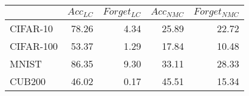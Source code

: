 \begin{tabular}{lrrrr}
\toprule
{} &  $Acc_{LC}$ &  $Forget_{LC}$ &  $Acc_{NMC}$ &  $Forget_{NMC}$ \\
\midrule
CIFAR-10  &       78.26 &           4.34 &        25.89 &           22.72 \\
CIFAR-100 &       53.37 &           1.29 &        17.84 &           10.48 \\
MNIST     &       86.35 &           9.30 &        33.11 &           28.33 \\
CUB200    &       46.02 &           0.17 &        45.51 &           15.34 \\
\bottomrule
\end{tabular}
